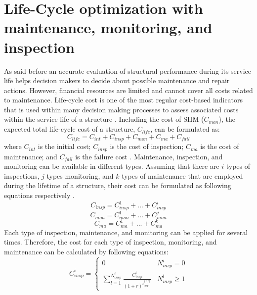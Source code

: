 \section{Life-Cycle optimization with maintenance, monitoring, and inspection}
\label{sec:opt-fatig}
\noindent
As said before an accurate evaluation of structural performance during its service life helps decision makers to decide about possible maintenance and repair actions. However, financial resources are limited
and cannot cover all costs related to maintenance. Life-cycle cost is one of the most regular cost-based indicators that is used within many decision making processes to assess associated costs within the 
service life of a structure \cite{Frangopol1997}. Including the cost of SHM ($C_{mon}$), the expected total life-cycle cost of a structure, $C_{life}$, can be formulated as: 
\begin{equation}
 C_{life} = C_{int} + C_{insp} + C_{mon} + C_{ma} +C_{fail}
 \label{eq:lifecost}
\end{equation}
\noindent
where $C_{int}$ is the initial cost; $C_{insp}$ is the cost of inspection; $C_{ma}$ is the cost of maintenance; and $C_{fail}$ is the failure cost \citep{Frangopol1997}. Maintenance, inspection, and monitoring
can be available in different types. Assuming that there are $i$ types of inspections, $j$ types monitoring, and $k$ types of maintenance that are employed during the lifetime of a structure, their cost can 
be formulated as following equations respectively \citep{SOLIMAN201691}. 
\begin{equation}
 C_{insp} = C_{insp}^1 +...+ C_{insp}^i
 \label{eq:inspcost}
\end{equation}
\begin{equation}
 C_{mon} = C_{mon}^1 +...+ C_{mon}^j
 \label{eq:inspcost}
\end{equation}
\begin{equation}
 C_{ma} = C_{ma}^1 +...+ C_{ma}^k
 \label{eq:inspcost}
\end{equation}
Each type of inspection, maintenance, and monitoring can be applied for several times. Therefore, the cost for each type of inspection, monitoring, and maintenance can be calculated by following equations:
\begin{equation}
C_{insp}^i =  
\begin{cases}\!%
0  & N_{insp}^i=0\\
\sum_{l=1}^{N_{insp}^i}\frac{C_{insp}^i}{(1+r)^{t_{insp}^{(i, l)}}}  & N_{insp}^i \geq1
\end{cases}
\label{eq:c_insp}
\end{equation}
